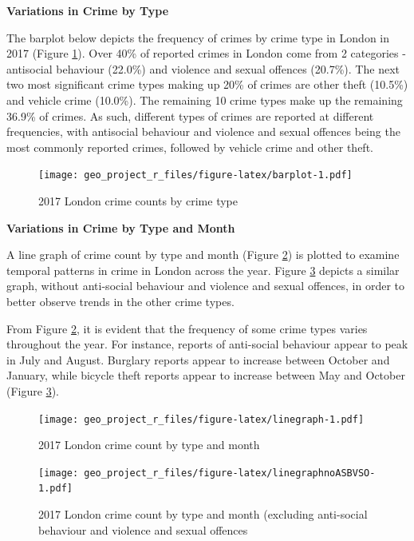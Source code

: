 \documentclass[]{article}
\theoremstyle{definition}
\theoremstyle{definition}
\theoremstyle{definition}
\theoremstyle{remark}
\begin{document}
\textbf{Variations in Crime by Type}

The barplot below depicts the frequency of crimes by crime type in
London in 2017 (Figure \ref{fig:barplot}). Over 40\% of reported crimes
in London come from 2 categories - antisocial behaviour (22.0\%) and
violence and sexual offences (20.7\%). The next two most significant
crime types making up 20\% of crimes are other theft (10.5\%) and
vehicle crime (10.0\%). The remaining 10 crime types make up the
remaining 36.9\% of crimes. As such, different types of crimes are
reported at different frequencies, with antisocial behaviour and
violence and sexual offences being the most commonly reported crimes,
followed by vehicle crime and other theft.

\begin{figure}
\centering
\texttt{[image: geo\_project\_r\_files/figure-latex/barplot-1.pdf]}
\caption{\label{fig:barplot}2017 London crime counts by crime type}
\end{figure}

\textbf{Variations in Crime by Type and Month}

A line graph of crime count by type and month (Figure
\ref{fig:linegraph}) is plotted to examine temporal patterns in crime in
London across the year. Figure \ref{fig:linegraphnoASBVSO} depicts a
similar graph, without anti-social behaviour and violence and sexual
offences, in order to better observe trends in the other crime types.

From Figure \ref{fig:linegraph}, it is evident that the frequency of
some crime types varies throughout the year. For instance, reports of
anti-social behaviour appear to peak in July and August. Burglary
reports appear to increase between October and January, while bicycle
theft reports appear to increase between May and October (Figure
\ref{fig:linegraphnoASBVSO}).

\begin{figure}
\centering
\texttt{[image: geo\_project\_r\_files/figure-latex/linegraph-1.pdf]}
\caption{\label{fig:linegraph}2017 London crime count by type and month}
\end{figure}

\begin{figure}
\centering
\texttt{[image: geo\_project\_r\_files/figure-latex/linegraphnoASBVSO-1.pdf]}
\caption{\label{fig:linegraphnoASBVSO}2017 London crime count by type and
month (excluding anti-social behaviour and violence and sexual offences}
\end{figure}
\end{document}
